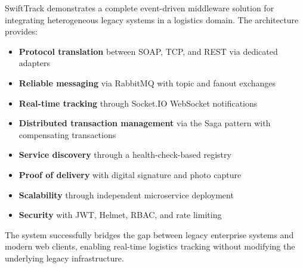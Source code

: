 \documentclass[12pt,a4paper]{article}
\begin{document}
SwiftTrack demonstrates a complete event-driven middleware solution for integrating heterogeneous legacy systems in a logistics domain. The architecture provides:

\begin{itemize}
  \item \textbf{Protocol translation} between SOAP, TCP, and REST via dedicated adapters
  \item \textbf{Reliable messaging} via RabbitMQ with topic and fanout exchanges
  \item \textbf{Real-time tracking} through Socket.IO WebSocket notifications
  \item \textbf{Distributed transaction management} via the Saga pattern with compensating transactions
  \item \textbf{Service discovery} through a health-check-based registry
  \item \textbf{Proof of delivery} with digital signature and photo capture
  \item \textbf{Scalability} through independent microservice deployment
  \item \textbf{Security} with JWT, Helmet, RBAC, and rate limiting
\end{itemize}

The system successfully bridges the gap between legacy enterprise systems and modern web clients, enabling real-time logistics tracking without modifying the underlying legacy infrastructure.
\end{document}

